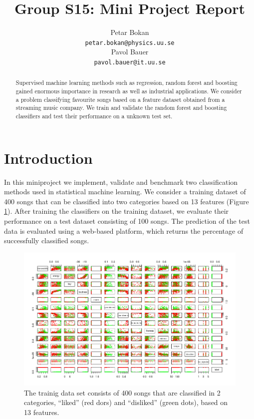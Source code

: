 \documentclass{article}
\title{Group S15: Mini Project Report}
\author{
  Petar Bokan \\
  \texttt{petar.bokan@physics.uu.se} \\
   \And
  Pavol Bauer \\
  \texttt{pavol.bauer@it.uu.se} \\
}
\begin{document}

\maketitle

\begin{abstract}
Supervised machine learning methods such as regression, random forest and boosting gained enormous importance in research as well as industrial applications.
We consider a problem classifying favourite songs based on a feature dataset obtained from a streaming music company.
We train and validate the random forest and boosting classifiers and test their performance on a unknown test set.

\end{abstract}

\section{Introduction}

In this miniproject we implement, validate and benchmark two classification methods used in statistical machine learning.
We consider a training dataset of 400 songs that can be classified into two categories based on 13 features (Figure \ref{fig:pairs}).
After training the classifiers on the training dataset, we evaluate their performance on a test dataset consisting of 100 songs.
The prediction of the test data is evaluated using a web-based platform, which returns the percentage of successfully classified songs.

\begin{figure}[htp!]
  \centering
  \includegraphics[height=0.5\textwidth] {figs/song_pairs.png}
  \caption{The trainig data set consists of 400 songs that are classified in 2 categories, ``liked'' (red dors) and ``disliked'' (green dots), based on 13 features.}
  \label{fig:pairs}
\end{figure}
\end{document}
